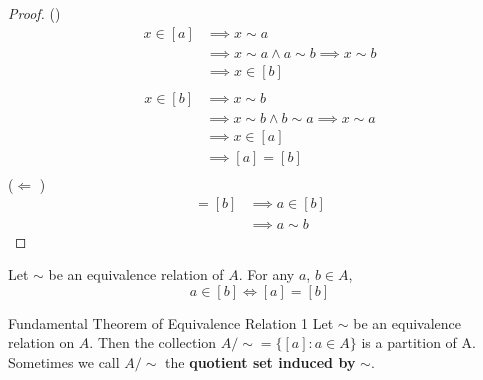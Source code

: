 \begin{proof}
    (\implies )
    \begin{align*}
        x \in [a] &\implies x \sim a\\
        &\implies x \sim a \land a \sim b \implies x \sim b\\
        &\implies x \in [b]\\
    \end{align*}
    \begin{align*}
        x \in [b] &\implies x \sim b\\
        &\implies x \sim b \land b \sim a \implies x \sim a\\
        &\implies x \in [a]\\
        &\implies [a] = [b]\\
    \end{align*}
    ($\Leftarrow $ )
    \begin{align*}
        [a] = [b] &\implies a \in [b]\\
        &\implies a \sim b
    \end{align*}
\end{proof}

\begin{corollary}{}{}
    Let $\sim$ be an equivalence relation of $A$. For any $a$, $b \in A$,
    \begin{equation*}
        a \in [b] \iff [a] = [b]
    \end{equation*}
\end{corollary}

\begin{theorem}{Fundamental Theorem of Equivalence Relation 1}{}
    Let $\sim$ be an equivalence relation on $A$. Then the collection $A/\sim = \{[a]: a \in A\} $ is a partition of A. Sometimes we call $A/\sim$ the \textbf{quotient set induced by} $\sim$.
\end{theorem}

